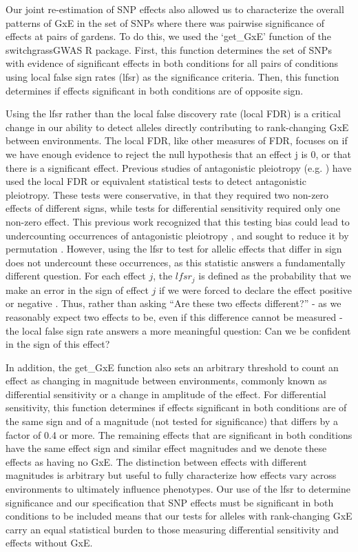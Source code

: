 \documentclass[
  9pt,
  twocolumn,
  twoside]{simple-article}%
\begin{document}
Our joint re-estimation of SNP effects also allowed us to characterize
the overall patterns of GxE in the set of SNPs where there was pairwise
significance of effects at pairs of gardens. To do this, we used the
`get\_GxE' function of the switchgrassGWAS R package. First, this
function determines the set of SNPs with evidence of significant effects
in both conditions for all pairs of conditions using local false sign
rates (lfsr) as the significance criteria. Then, this function
determines if effects significant in both conditions are of opposite
sign.

Using the lfsr rather than the local false discovery rate (local FDR) is
a critical change in our ability to detect alleles directly contributing
to rank-changing GxE between environments. The local FDR, like other
measures of FDR, focuses on if we have enough evidence to reject the
null hypothesis that an effect j is 0, or that there is a significant
effect. Previous studies of antagonistic pleiotropy (e.g.
\citep{lowry2019qtl}) have used the local FDR or equivalent statistical
tests to detect antagonistic pleiotropy. These tests were conservative,
in that they required two non-zero effects of different signs, while
tests for differential sensitivity required only one non-zero effect.
This previous work recognized that this testing bias could lead to
undercounting occurrences of antagonistic pleiotropy
\citep{anderson2011evolutionary, des2013genotype}, and sought to reduce
it by permutation \citep{anderson2013genetic}. However, using the lfsr
to test for allelic effects that differ in sign does not undercount
these occurrences, as this statistic answers a fundamentally different
question. For each effect \(j\), the \(lfsr_j\) is defined as the
probability that we make an error in the sign of effect \(j\) if we were
forced to declare the effect positive or negative
\citet{10.1093/biostatistics/kxw041}. Thus, rather than asking ``Are
these two effects different?'' - as we reasonably expect two effects to
be, even if this difference cannot be measured - the local false sign
rate answers a more meaningful question: Can we be confident in the sign
of this effect?

In addition, the get\_GxE function also sets an arbitrary threshold to
count an effect as changing in magnitude between environments, commonly
known as differential sensitivity or a change in amplitude of the
effect. For differential sensitivity, this function determines if
effects significant in both conditions are of the same sign and of a
magnitude (not tested for significance) that differs by a factor of 0.4
or more. The remaining effects that are significant in both conditions
have the same effect sign and similar effect magnitudes and we denote
these effects as having no GxE. The distinction between effects with
different magnitudes is arbitrary but useful to fully characterize how
effects vary across environments to ultimately influence phenotypes. Our
use of the lfsr to determine significance and our specification that SNP
effects must be significant in both conditions to be included means that
our tests for alleles with rank-changing GxE carry an equal statistical
burden to those measuring differential sensitivity and effects without
GxE.
\end{document}

